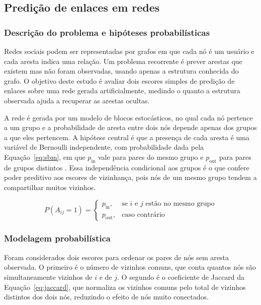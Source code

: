 \subsection{Predição de enlaces em redes}

\subsubsection{Descrição do problema e hipóteses probabilísticas}

Redes sociais podem ser representadas por grafos em que cada nó é um usuário e cada
aresta indica uma relação. Um problema recorrente é prever arestas que existem mas
não foram observadas, usando apenas a estrutura conhecida do grafo. O objetivo deste
estudo é avaliar dois escores simples de predição de enlaces sobre uma rede gerada
artificialmente, medindo o quanto a estrutura observada ajuda a recuperar as arestas
ocultas.

A rede é gerada por um modelo de blocos estocásticos, no qual cada nó pertence a um
grupo e a probabilidade de aresta entre dois nós depende apenas dos grupos a que eles
pertencem. A hipótese central é que a presença de cada aresta é uma variável de
Bernoulli independente, com probabilidade dada pela Equação~\ref{eq:sbm}, em que
$p_{\text{in}}$ vale para pares do mesmo grupo e $p_{\text{out}}$ para pares de grupos
distintos \cite{chan2021probability}. Essa independência condicional aos grupos é o
que confere poder preditivo aos escores de vizinhança, pois nós de um mesmo grupo
tendem a compartilhar muitos vizinhos.

\begin{equation}
	P(A_{ij} = 1) =
	\begin{cases}
		p_{\text{in}}, & \text{se } i \text{ e } j \text{ estão no mesmo grupo} \\
		p_{\text{out}}, & \text{caso contrário}
	\end{cases}
	\label{eq:sbm}
\end{equation}

\subsubsection{Modelagem probabilística}

Foram considerados dois escores para ordenar os pares de nós sem aresta observada. O
primeiro é o número de vizinhos comuns, que conta quantos nós são simultaneamente
vizinhos de $i$ e de $j$. O segundo é o coeficiente de Jaccard da
Equação~\ref{eq:jaccard}, que normaliza os vizinhos comuns pelo total de vizinhos
distintos dos dois nós, reduzindo o efeito de nós muito conectados.

